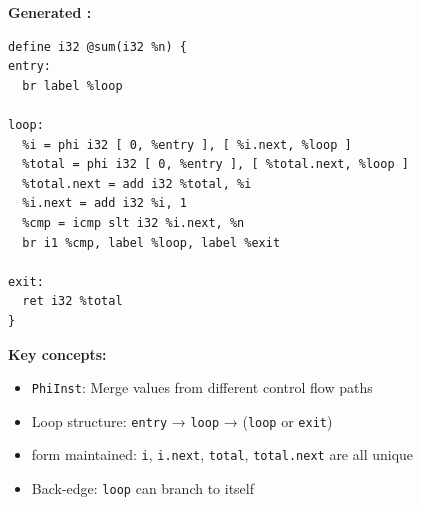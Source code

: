 \textbf{Generated  :}
\begin{lstlisting}[style=ir]
define i32 @sum(i32 %n) {
entry:
  br label %loop

loop:
  %i = phi i32 [ 0, %entry ], [ %i.next, %loop ]
  %total = phi i32 [ 0, %entry ], [ %total.next, %loop ]
  %total.next = add i32 %total, %i
  %i.next = add i32 %i, 1
  %cmp = icmp slt i32 %i.next, %n
  br i1 %cmp, label %loop, label %exit

exit:
  ret i32 %total
}
\end{lstlisting}

\textbf{Key concepts:}
\begin{itemize}[noitemsep]
  \item \texttt{PhiInst}: Merge values from different control flow paths
  \item Loop structure: \texttt{entry} → \texttt{loop} → (\texttt{loop} or \texttt{exit})
  \item {} form maintained: \texttt{i}, \texttt{i.next}, \texttt{total}, \texttt{total.next} are all unique
  \item Back-edge: \texttt{loop} can branch to itself
\end{itemize}

